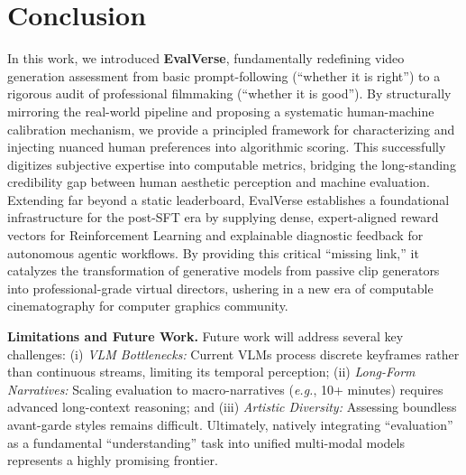 \documentclass{llmxive}
\begin{document}


\section{Conclusion}

In this work, we introduced \textbf{EvalVerse}, fundamentally redefining video generation assessment from basic prompt-following (``whether it is right'') to a rigorous audit of professional filmmaking (``whether it is good''). By structurally mirroring the real-world pipeline and proposing a systematic human-machine calibration mechanism, we provide a principled framework for characterizing and injecting nuanced human preferences into algorithmic scoring. This successfully digitizes subjective expertise into computable metrics, bridging the long-standing credibility gap between human aesthetic perception and machine evaluation. Extending far beyond a static leaderboard, EvalVerse establishes a foundational infrastructure for the post-SFT era by supplying dense, expert-aligned reward vectors for Reinforcement Learning and explainable diagnostic feedback for autonomous agentic workflows. By providing this critical ``missing link,'' it catalyzes the transformation of generative models from passive clip generators into professional-grade virtual directors, ushering in a new era of computable cinematography for computer graphics community.



\noindent
\textbf{Limitations and Future Work.} Future work will address several key challenges: (i) \textit{VLM Bottlenecks:} Current VLMs process discrete keyframes rather than continuous streams, limiting its temporal perception; (ii) \textit{Long-Form Narratives:} Scaling evaluation to macro-narratives (\emph{e.g.}, 10+ minutes) requires advanced long-context reasoning; and (iii) \textit{Artistic Diversity:} Assessing boundless avant-garde styles remains difficult. Ultimately, natively integrating ``evaluation'' as a fundamental ``understanding'' task into unified multi-modal models represents a highly promising frontier.
\end{document}
